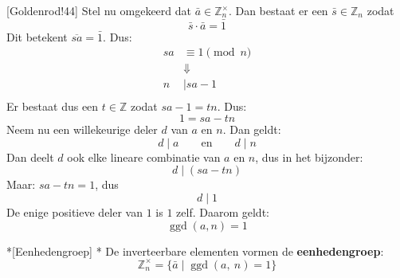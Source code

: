 \inlinetext{$\Rightarrow$}[Goldenrod!44] Stel nu omgekeerd dat $\bar{a} \in \mathbb{Z}_n^{\times}$. Dan bestaat er een $\bar{s} \in \mathbb{Z}_n$ zodat
\begin{equation*}
    \bar{s} \cdot \bar{a} = \bar{1}
\end{equation*}
Dit betekent $\overline{sa} = \bar{1}$. Dus:
\begin{equation*}
    \begin{aligned}
        sa &\equiv 1 \pmod n \\
        &\Downarrow \\
        n &\mid sa - 1 \\
    \end{aligned}
\end{equation*}
Er bestaat dus een $t \in \mathbb{Z}$ zodat $sa - 1 = tn$. Dus:
\begin{equation*}
    1 = sa - tn
\end{equation*}
Neem nu een willekeurige deler $d$ van $a$ en $n$. Dan geldt:
\begin{equation*}
    d \mid a \qquad \text{en} \qquad d \mid n
\end{equation*}
Dan deelt $d$ ook elke lineare combinatie van $a$ en $n$, dus in het bijzonder:
\begin{equation*}
    d \mid (sa - tn)
\end{equation*}
Maar: $sa - tn = 1$, dus
\begin{equation*}
    d \mid 1
\end{equation*}
De enige positieve deler van $1$ is $1$ zelf. Daarom geldt:
\begin{equation*}
    \operatorname{ggd}(a,n) = 1
\end{equation*}

\newpage
\begin{nicedefinition}*[Eenhedengroep]
    \nextpart[]*
    De inverteerbare elementen vormen de \textcolor{PineGreen!75!black}{\textbf{eenhedengroep}}:
    \begin{equation*}
        \mathbb{Z}_n^{\times} = \{\bar{a} \mid \operatorname{ggd}(a,\ n) = 1\}
    \end{equation*}
\end{nicedefinition}

